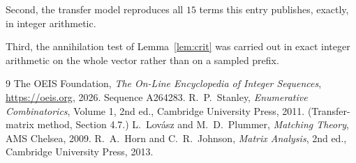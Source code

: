 \documentclass[11pt,a4paper]{article}
\theoremstyle{plain}
\theoremstyle{definition}
\begin{document}
Second, the transfer model reproduces all $15$ terms this entry publishes, exactly, in
integer arithmetic.

Third, the annihilation test of Lemma~\ref{lem:crit} was carried out in exact integer
arithmetic on the whole vector rather than on a sampled prefix.

\begin{thebibliography}{9}
 The OEIS Foundation, \emph{The On-Line Encyclopedia of Integer
Sequences}, \url{https://oeis.org}, 2026. Sequence A264283.
 R.~P.~Stanley, \emph{Enumerative Combinatorics}, Volume 1, 2nd ed.,
Cambridge University Press, 2011. (Transfer-matrix method, Section 4.7.)
 L.~Lov\'asz and M.~D.~Plummer, \emph{Matching Theory}, AMS Chelsea, 2009.
 R.~A.~Horn and C.~R.~Johnson, \emph{Matrix Analysis}, 2nd ed., Cambridge
University Press, 2013.
\end{thebibliography}
\end{document}
